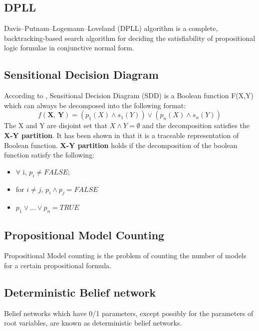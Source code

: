     \subsection{DPLL}
    Davis–Putnam–Logemann–Loveland (DPLL) algorithm is a complete, backtracking-based search algorithm for deciding the satisfiability of propositional logic formulae in conjunctive normal form. \cite{Davis:1960:CPQ:321033.321034}
    
   
    \subsection{Sensitional Decision Diagram}
    According to \cite{Darwiche:2011:SNC:2283516.2283536}, Sensitional Decision Diagram (SDD) is a Boolean function F(X,Y) which can always be decomposed into the following format:
    $$f(\textbf{X, Y}) = (p_{1}(X) \wedge s_{1}(Y)) \vee (p_{n}(X) \wedge s_{n}(Y)) $$
    The X and Y are disjoint set that $X \wedge Y = \emptyset$ and the decomposition satisfies the \textbf{X-Y partition}. It has been shown in \cite{Darwiche:2011:SNC:2283516.2283536} that it is a traceable representation of Boolean function.
    \textbf{X-Y partition} holds if the decomposition of the boolean function satisfy the following:
    \begin{itemize}
        \item  $\forall$ i, $p_{i} \neq FALSE$;
        \item for $i \neq j$, $p_{i} \wedge p_{j} = FALSE$
        \item $p_{1} \vee ... \vee p_{n} = TRUE$
    \end{itemize}
    
    \subsection{Propositional Model Counting}
    Propositional Model counting is the problem of counting the number of models for a certain propositional formula.\cite{Biere:2009:HSV:1550723-sat-handbook}
    
    \subsection{Deterministic Belief network}
    Belief networks which have 0/1 parameters, except possibly for the parameters of root variables, are known as deterministic belief networks.\cite{enc1}
    
    
    